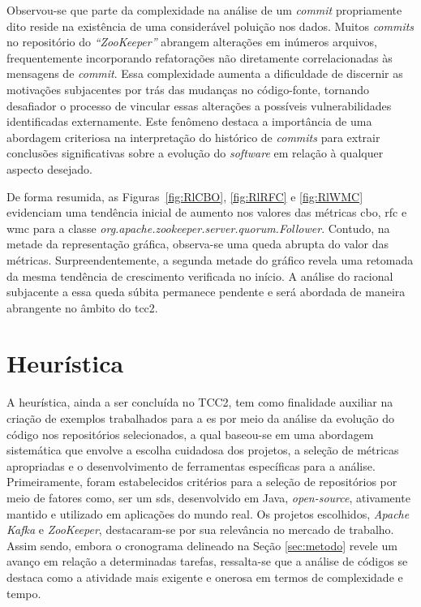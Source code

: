 
Observou-se que parte da complexidade na análise de um \textit{commit} propriamente dito reside na existência de uma considerável poluição nos dados. Muitos \textit{commits} no repositório do \textit{``ZooKeeper''} abrangem alterações em inúmeros arquivos, frequentemente incorporando refatorações não diretamente correlacionadas às mensagens de \textit{commit}. Essa complexidade aumenta a dificuldade de discernir as motivações subjacentes por trás das mudanças no código-fonte, tornando desafiador o processo de vincular essas alterações a possíveis vulnerabilidades identificadas externamente. Este fenômeno destaca a importância de uma abordagem criteriosa na interpretação do histórico de \textit{commits} para extrair conclusões significativas sobre a evolução do \textit{software} em relação à qualquer aspecto desejado.

De forma resumida, as Figuras~\ref{fig:RlCBO}, \ref{fig:RlRFC} e \ref{fig:RlWMC} evidenciam uma tendência inicial de aumento nos valores das métricas \gls{cbo}, \gls{rfc} e \gls{wmc} para a classe \textit{org.apache.zookeeper.server.quorum.Follower}. Contudo, na metade da representação gráfica, observa-se uma queda abrupta do valor das métricas. Surpreendentemente, a segunda metade do gráfico revela uma retomada da mesma tendência de crescimento verificada no início. A análise do racional subjacente a essa queda súbita permanece pendente e será abordada de maneira abrangente no âmbito do \gls{tcc2}.

\section{Heurística}
\label{sec:heuristica}

A heurística, ainda a ser concluída no TCC2, tem como finalidade auxiliar na criação de exemplos trabalhados para a \gls{es} por meio da análise da evolução do código nos repositórios selecionados, a qual baseou-se em uma abordagem sistemática que envolve a escolha cuidadosa dos projetos, a seleção de métricas apropriadas e o desenvolvimento de ferramentas específicas para a análise. Primeiramente, foram estabelecidos critérios para a seleção de repositórios por meio de fatores como, ser um \gls{sds}, desenvolvido em Java, \textit{open-source}, ativamente mantido e utilizado em aplicações do mundo real. Os projetos escolhidos, \textit{Apache Kafka} e \textit{ZooKeeper}, destacaram-se por sua relevância no mercado de trabalho. Assim sendo, embora o cronograma delineado na Seção \ref{sec:metodo} revele um avanço em relação a determinadas tarefas, ressalta-se que a análise de códigos se destaca como a atividade mais exigente e onerosa em termos de complexidade e tempo.

